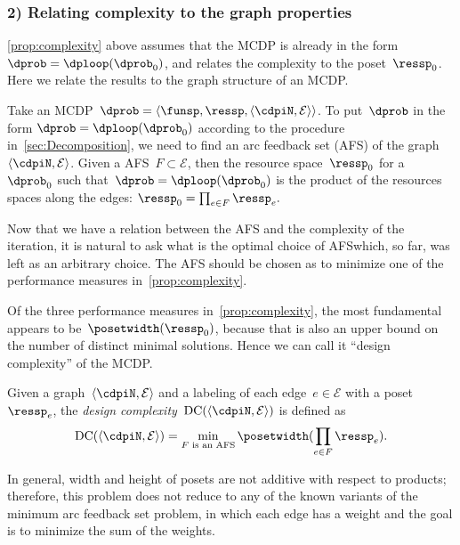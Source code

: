 \subsubsection{2) Relating complexity to the graph properties}

\cref{prop:complexity} above assumes that the MCDP is already in the
form $\dprob=\dploop(\dprob_{0})$, and relates the complexity to
the poset~$\ressp_{0}$. Here we relate the results to the graph
structure of an MCDP.

Take an MCDP~$\dprob=\left\langle \funsp,\ressp,\left\langle \cdpiN,\mathcal{E}\right\rangle \right\rangle $.
To put~$\dprob$ in the form $\dprob=\dploop(\dprob_{0})$ according
to the procedure in~\cref{sec:Decomposition}, we need to find an arc
feedback set (AFS) of the graph~$\left\langle \cdpiN,\mathcal{E}\right\rangle $.
Given a AFS~$F\subset\mathcal{E}$, then the resource space~$\ressp_{0}$
for a~$\dprob_{0}$ such that~$\dprob=\dploop(\dprob_{0})$ is the
product of the resources spaces along the edges: $\ressp_{0}=\prod_{e\in F}\ressp_{e}.$

Now that we have a relation between the AFS and the complexity of
the iteration, it is natural to ask what is the optimal choice of
AFS\textemdash which, so far, was left as an arbitrary choice. The
AFS should be chosen as to minimize one of the performance measures
in~\cref{prop:complexity}.

Of the three performance measures in~\cref{prop:complexity}, the most
fundamental appears to be~$\posetwidth(\ressp_{0})$, because that
is also an upper bound on the number of distinct minimal solutions.
Hence we can call it ``design complexity'' of the MCDP.
\begin{definition}
\label{def:design-complexity}Given a graph~$\left\langle \cdpiN,\mathcal{E}\right\rangle $
and a labeling of each edge~$e\in\mathcal{E}$ with a poset~$\ressp_{e}$,
the \emph{design complexity~}$\text{DC}(\left\langle \cdpiN,\mathcal{E}\right\rangle )$
is defined as
\begin{equation}
\text{DC}(\left\langle \cdpiN,\mathcal{E}\right\rangle )=\min_{F\text{ is an AFS}}\posetwidth(\prod_{e\in F}\ressp_{e}).\label{eq:complexity}
\end{equation}
\end{definition}
In general, width and height of posets are not additive with respect
to products; therefore, this problem does not reduce to any of the
known variants of the minimum arc feedback set problem, in which
each edge has a weight and the goal is to minimize the sum of the
weights.



